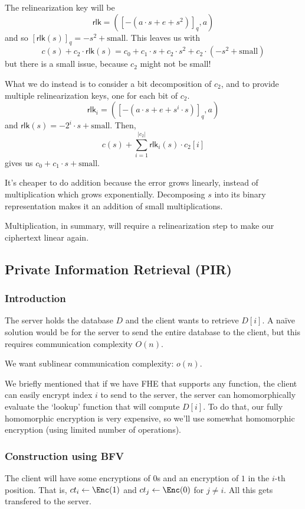 The relinearization key will be
\[\mathsf{rlk} = \left( [-(a\cdot s + e + s^2)]_q, a \right)\]
and so $[\mathsf{rlk}(s)]_q = -s^2 + \text{small}$. This leaves us with
\[c(s) + c_2 \cdot \mathsf{rlk}(s) = c_0 + c_1\cdot s + c_2\cdot s^2 + c_2\cdot (-s^2 + \text{small})\]
but there is a small issue, because $c_2$ might not be small!

What we do instead is to consider a bit decomposition of $c_2$, and to provide multiple relinearization keys, one for each bit of $c_2$.
\[\mathsf{rlk}_i = ([-(a\cdot s + e + s^i\cdot s)]_q, a)\]
and $\mathsf{rlk}(s) = -2^i\cdot s + \text{small}$. Then,
\[c(s) + \sum^{|c_2|}_{i=1}\mathsf{rlk}_i(s)\cdot c_2[i]\]
gives us $c_0 + c_1\cdot s + \text{small}$.

It's cheaper to do addition because the error grows linearly, instead of multiplication which grows exponentially. Decomposing $s$ into its binary representation makes it an addition of small multiplications.

Multiplication, in summary, will require a relinearization step to make our ciphertext linear again.

\subsection{Private Information Retrieval (PIR)}
\subsubsection{Introduction}
The server holds the database $D$ and the client wants to retrieve $D[i]$. A na\"ive solution would be for the server to send the entire database to the client, but this requires communication complexity $O(n)$.


We want sublinear communication complexity: $o(n)$.

We briefly mentioned that if we have FHE that supports any function, the client can easily encrypt index $i$ to send to the server, the server can homomorphically evaluate the `lookup' function that will compute $D[i]$. To do that, our fully homomorphic encryption is very expensive, so we'll use somewhat homomorphic encryption (using limited number of operations).

\subsubsection{Construction using BFV}
The client will have some encryptions of $0$s and an encryption of $1$ in the $i$-th position. That is, $ct_i \leftarrow \Enc(1)$ and $ct_j \leftarrow \Enc(0)$ for $j\neq i$. All this gets transfered to the server.

